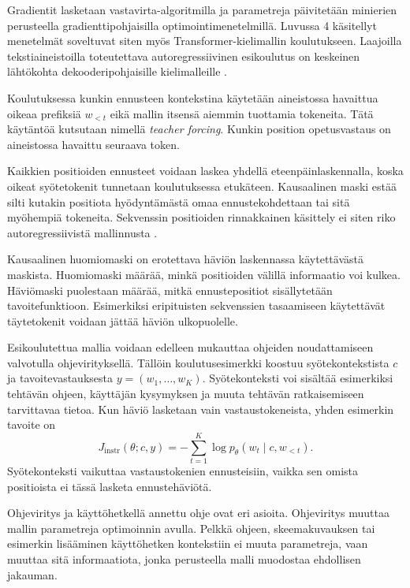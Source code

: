 Gradientit lasketaan vastavirta-algoritmilla ja parametreja
päivitetään minierien perusteella gradienttipohjaisilla
optimointimenetelmillä. Luvussa 4 käsitellyt menetelmät
soveltuvat siten myös Transformer-kielimallin koulutukseen.
Laajoilla tekstiaineistoilla toteutettava autoregressiivinen
esikoulutus on keskeinen lähtökohta dekooderipohjaisille
kielimalleille \cite{radford2018improving}.

Koulutuksessa kunkin ennusteen kontekstina käytetään aineistossa
havaittua oikeaa prefiksiä \(w_{<t}\) eikä mallin itsensä aiemmin
tuottamia tokeneita. Tätä käytäntöä kutsutaan nimellä
\emph{teacher forcing}. Kunkin position opetusvastaus on aineistossa
havaittu seuraava token.

Kaikkien positioiden ennusteet voidaan laskea yhdellä
eteenpäinlaskennalla, koska oikeat syötetokenit tunnetaan
koulutuksessa etukäteen. Kausaalinen maski estää silti kutakin
positiota hyödyntämästä omaa ennustekohdettaan tai sitä myöhempiä
tokeneita. Sekvenssin positioiden rinnakkainen käsittely ei siten
riko autoregressiivistä mallinnusta
\cite{vaswani2017attention}.

Kausaalinen huomiomaski on erotettava häviön laskennassa
käytettävästä maskista. Huomiomaski määrää, minkä positioiden
välillä informaatio voi kulkea. Häviömaski puolestaan
määrää, mitkä ennustepositiot sisällytetään tavoitefunktioon.
Esimerkiksi eripituisten sekvenssien tasaamiseen käytettävät
täytetokenit voidaan jättää häviön ulkopuolelle.

Esikoulutettua mallia voidaan edelleen mukauttaa
ohjeiden noudattamiseen valvotulla ohjevirityksellä.
Tällöin koulutusesimerkki koostuu syötekontekstista \(c\)
ja tavoitevastauksesta \(y=(w_1,\dots,w_K)\).
Syötekonteksti voi sisältää esimerkiksi tehtävän ohjeen,
käyttäjän kysymyksen ja muuta tehtävän ratkaisemiseen
tarvittavaa tietoa. Kun häviö lasketaan vain
vastaustokeneista, yhden esimerkin tavoite on
$$
J_{\mathrm{instr}}(\theta;c,y)
=
-\sum_{t=1}^{K}
\log p_{\theta}(w_t \mid c,w_{<t}).
$$
Syötekonteksti vaikuttaa vastaustokenien ennusteisiin,
vaikka sen omista positioista ei tässä lasketa
ennustehäviötä.

Ohjeviritys ja käyttöhetkellä annettu ohje ovat eri asioita.
Ohjeviritys muuttaa mallin parametreja optimoinnin avulla.
Pelkkä ohjeen, skeemakuvauksen tai esimerkin lisääminen
käyttöhetken kontekstiin ei muuta parametreja, vaan muuttaa
sitä informaatiota, jonka perusteella malli muodostaa
ehdollisen jakauman.

